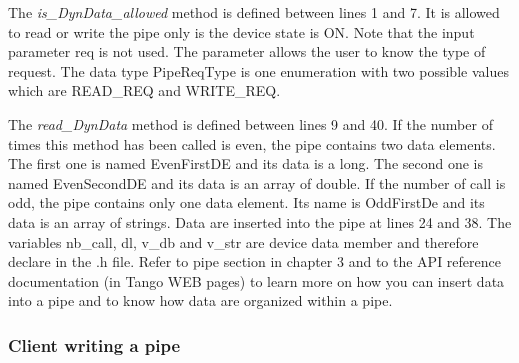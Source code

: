 The \emph{is\_DynData\_allowed} method is defined between lines 1
and 7. It is allowed to read or write the pipe only is the device
state is ON. Note that the input parameter req is not used. The parameter
allows the user to know the type of request. The data type PipeReqType
is one enumeration with two possible values which are READ\_REQ and
WRITE\_REQ.

The \emph{read\_DynData} method is defined between lines 9 and 40.
If the number of times this method has been called is even, the pipe
contains two data elements. The first one is named EvenFirstDE and
its data is a long. The second one is named EvenSecondDE and its data
is an array of double. If the number of call is odd, the pipe contains
only one data element. Its name is OddFirstDe and its data is an array
of strings. Data are inserted into the pipe at lines 24 and 38. The
variables nb\_call, dl, v\_db and v\_str are device data member and
therefore declare in the .h file. Refer to pipe section in chapter
3 and to the API reference documentation (in Tango WEB pages) to learn
more on how you can insert data into a pipe and to know how data are
organized within a pipe.

\subsubsection{Client writing a pipe}


